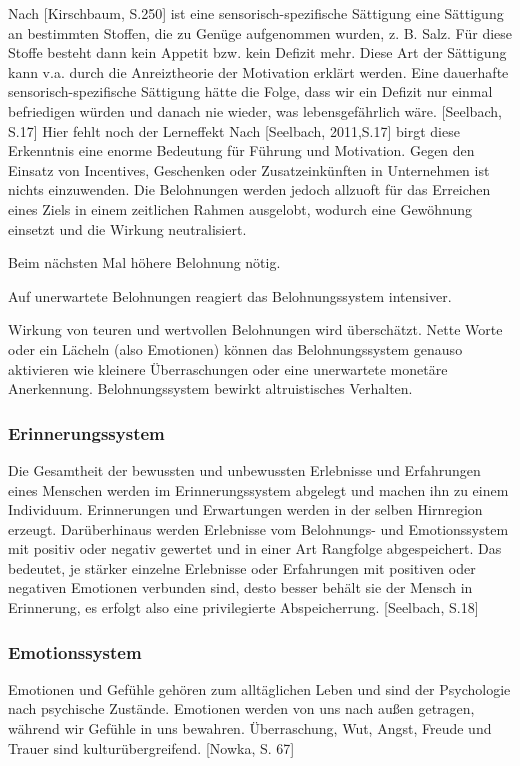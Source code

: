 Nach [Kirschbaum, S.250] ist eine sensorisch-spezifische Sättigung eine Sättigung an bestimmten Stoffen, die zu Genüge aufgenommen wurden, z. B. Salz. Für diese Stoffe besteht dann kein Appetit bzw. kein Defizit mehr. Diese Art der Sättigung kann v.a. durch die Anreiztheorie der Motivation erklärt werden. 
Eine dauerhafte sensorisch-spezifische Sättigung hätte die Folge, dass wir ein Defizit nur einmal befriedigen würden und danach nie wieder, was lebensgefährlich wäre. [Seelbach, S.17] Hier fehlt noch der Lerneffekt
Nach  [Seelbach, 2011,S.17] birgt diese Erkenntnis eine enorme Bedeutung für Führung und Motivation. Gegen den Einsatz von Incentives, Geschenken oder Zusatzeinkünften in Unternehmen ist nichts einzuwenden. Die Belohnungen werden jedoch allzuoft für das Erreichen eines Ziels in einem zeitlichen Rahmen ausgelobt, wodurch eine Gewöhnung einsetzt und die Wirkung neutralisiert. 

Beim nächsten Mal höhere Belohnung nötig.

Auf unerwartete Belohnungen reagiert das Belohnungssystem intensiver.

Wirkung von teuren und wertvollen Belohnungen wird überschätzt. Nette Worte oder ein Lächeln (also Emotionen) können das Belohnungssystem \glqq genauso aktivieren wie kleinere Überraschungen oder eine unerwartete monetäre Anerkennung\grqq.   
Belohnungssystem bewirkt altruistisches Verhalten.


\subsubsection{Erinnerungssystem}
Die Gesamtheit der bewussten und unbewussten Erlebnisse und Erfahrungen eines Menschen werden im Erinnerungssystem abgelegt und machen ihn zu einem Individuum. Erinnerungen und Erwartungen werden in der selben Hirnregion erzeugt. Darüberhinaus werden Erlebnisse vom Belohnungs- und Emotionssystem mit positiv oder negativ gewertet und in einer Art Rangfolge abgespeichert. 
Das bedeutet, je stärker einzelne Erlebnisse oder Erfahrungen mit positiven oder negativen Emotionen verbunden sind, desto besser behält sie der Mensch in Erinnerung, es erfolgt also eine \glqq privilegierte Abspeicherrung\grqq. [Seelbach, S.18]

\subsubsection{Emotionssystem}
Emotionen und Gefühle gehören zum alltäglichen Leben und sind der Psychologie nach  psychische Zustände. Emotionen werden von uns nach außen getragen, während wir Gefühle in uns bewahren. Überraschung, Wut, Angst, Freude und Trauer sind kulturübergreifend. [Nowka, S. 67]

